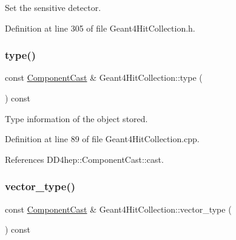 Set the sensitive detector. 



Definition at line 305 of file Geant4\+Hit\+Collection.\+h.

\hypertarget{class_d_d4hep_1_1_simulation_1_1_geant4_hit_collection_a6fc23e64aca4b8371fe3ee19ac7c3add}{}\label{class_d_d4hep_1_1_simulation_1_1_geant4_hit_collection_a6fc23e64aca4b8371fe3ee19ac7c3add} 
\subsubsection{\texorpdfstring{type()}{type()}}
{\footnotesize\ttfamily const \hyperlink{class_d_d4hep_1_1_component_cast}{Component\+Cast} \& Geant4\+Hit\+Collection\+::type (\begin{DoxyParamCaption}{ }\end{DoxyParamCaption}) const}



Type information of the object stored. 



Definition at line 89 of file Geant4\+Hit\+Collection.\+cpp.



References D\+D4hep\+::\+Component\+Cast\+::cast.

\hypertarget{class_d_d4hep_1_1_simulation_1_1_geant4_hit_collection_aaf72f344cf60e69b9af3e518475d0be5}{}\label{class_d_d4hep_1_1_simulation_1_1_geant4_hit_collection_aaf72f344cf60e69b9af3e518475d0be5} 
\subsubsection{\texorpdfstring{vector\+\_\+type()}{vector\_type()}}
{\footnotesize\ttfamily const \hyperlink{class_d_d4hep_1_1_component_cast}{Component\+Cast} \& Geant4\+Hit\+Collection\+::vector\+\_\+type (\begin{DoxyParamCaption}{ }\end{DoxyParamCaption}) const}



